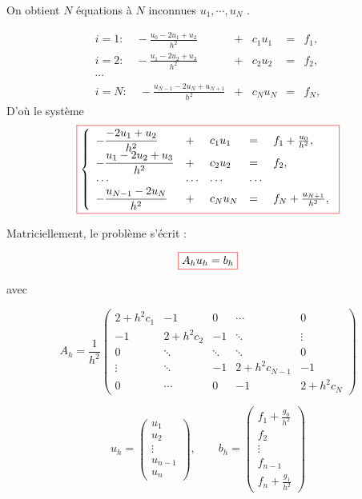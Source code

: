 \documentclass{beamer}
\newcommand{\myredbox}[1]{\fcolorbox{red}{white}{$\displaystyle#1$}}
\begin{document}
\begin{frame} 
On obtient $N$ équations à $N$ inconnues $u_1, \cdots , u_N$ . 

\[\begin{array}{lllll}
i=1:\quad -{\displaystyle \frac{u_{0}-2u_1+u_{2}}{h^2} }&+&c_1u_1&=& f_1, \\
i=2:\quad -{\displaystyle \frac{u_{1}-2u_2+u_{3}}{h^2} }&+&c_2u_2 &= &f_2, \\
\cdots&&&&\\
i=N:\quad -{\displaystyle \frac{u_{N-1}-2u_{N}+u_{N+1}}{h^2} }&+&c_{N}u_{N} &=& f_{N},

\end{array}
\]
D'où le système
\[\myredbox{\left\{\begin{array}{lllll}
-{\displaystyle \frac{-2u_1+u_{2}}{h^2}}&+&c_1u_1 &= &f_1+\frac{u_{0}}{h^2}, \\
-{\displaystyle \frac{u_{1}-2u_2+u_{3}}{h^2}}&+&c_2u_2 &=& f_2, \\
\cdots&\cdots&\cdots&\cdots\\
-{\displaystyle \frac{u_{N-1}-2u_{N}}{h^2}}&+&c_{N}u_{N} &=& f_{N}+\frac{u_{N+1}}{h^2},

\end{array}\right.}
\]


 \end{frame}
 
\begin{frame} 

 Matriciellement, le problème s'écrit : 
 
 \begin{equation}
 \myredbox{A_h u_h =b_h}
 \end{equation}
 
  avec
 
 
 
 \[A_h=\frac{1}{h^2}
\left(\begin{array}{ccccc}
2+h^2c_1&-1&0&\cdots&0\\
-1&2+h^2c_2&-1&\ddots&\vdots\\
0&  \ddots &\ddots&\ddots&0\\
\vdots &\ddots &-1&2+h^2c_{N-1}&-1\\
   0&\cdots &0&-1 &2+h^2c_N
\end{array}\right)
\] 
 

\[u_h =\left(\begin{array}{c}
u_1\\u_2\\ \vdots \\ u_{n-1} \\ u_n
\end{array}\right), \qquad b_h =\left(\begin{array}{c}
f_1+\frac{g_0}{h^2}\\f_2\\ \vdots \\ f_{n-1} \\ f_n+\frac{g_1}{h^2}
\end{array}\right)
\]

\end{frame}
 
\end{document}
